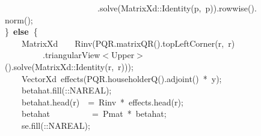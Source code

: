 \documentclass[shortnames,article]{jss}
\newcommand{\hlstd}[1]{\textcolor[rgb]{0,0,0}{#1}}
\newcommand{\hlopt}[1]{\textcolor[rgb]{0,0,0}{#1}}
\newcommand{\hlkwa}[1]{\textcolor[rgb]{0.61,0.13,0.93}{\bf{#1}}}
\newcommand{\hlkwd}[1]{\textcolor[rgb]{0,0,0}{#1}}
\begin{document}
\begin{figure}[htb]
    \hlstd{}\hlstd{\ \ \ \ \ \ \ \ \ \ \ \ \ \ \ \ \ \ \ \ \ \ }\hlstd{}\hlopt{.}\hlstd{}\hlkwd{solve}\hlstd{}\hlopt{(}\hlstd{MatrixXd}\hlopt{::}\hlstd{}\hlkwd{Identity}\hlstd{}\hlopt{(}\hlstd{p}\hlopt{,\ }\hlstd{p}\hlopt{)).}\hlstd{}\hlkwd{rowwise}\hlstd{}\hlopt{().}\hlstd{}\hlkwd{norm}\hlstd{}\hlopt{();}\hspace*{\fill}\\
    \hlstd{}\hlopt{\}\ }\hlstd{}\hlkwa{else\ }\hlstd{}\hlopt{\{}\hspace*{\fill}\\
    \hlstd{}\hlstd{\ \ \ \ }\hlstd{MatrixXd}\hlstd{\ \ \ \ }\hlstd{}\hlkwd{Rinv}\hlstd{}\hlopt{(}\hlstd{PQR}\hlopt{.}\hlstd{}\hlkwd{matrixQR}\hlstd{}\hlopt{().}\hlstd{}\hlkwd{topLeftCorner}\hlstd{}\hlopt{(}\hlstd{r}\hlopt{,\ }\hlstd{r}\hlopt{)}\hspace*{\fill}\\
    \hlstd{}\hlstd{\ \ \ \ \ \ \ \ \ }\hlstd{}\hlopt{.}\hlstd{triangularView}\hlopt{$<$}\hlstd{Upper}\hlopt{$>$().}\hlstd{}\hlkwd{solve}\hlstd{}\hlopt{(}\hlstd{MatrixXd}\hlopt{::}\hlstd{}\hlkwd{Identity}\hlstd{}\hlopt{(}\hlstd{r}\hlopt{,\ }\hlstd{r}\hlopt{)));}\hspace*{\fill}\\
    \hlstd{}\hlstd{\ \ \ \ }\hlstd{VectorXd\ }\hlkwd{effects}\hlstd{}\hlopt{(}\hlstd{PQR}\hlopt{.}\hlstd{}\hlkwd{householderQ}\hlstd{}\hlopt{().}\hlstd{}\hlkwd{adjoint}\hlstd{}\hlopt{()\ {*}\ }\hlstd{y}\hlopt{);}\hspace*{\fill}\\
    \hlstd{}\hlstd{\ \ \ \ }\hlstd{betahat}\hlopt{.}\hlstd{}\hlkwd{fill}\hlstd{}\hlopt{(::}\hlstd{NA\textunderscore REAL}\hlopt{);}\hspace*{\fill}\\
    \hlstd{}\hlstd{\ \ \ \ }\hlstd{betahat}\hlopt{.}\hlstd{}\hlkwd{head}\hlstd{}\hlopt{(}\hlstd{r}\hlopt{)}\hlstd{\ \ }\hlopt{=\ }\hlstd{Rinv\ }\hlopt{{*}\ }\hlstd{effects}\hlopt{.}\hlstd{}\hlkwd{head}\hlstd{}\hlopt{(}\hlstd{r}\hlopt{);}\hspace*{\fill}\\
    \hlstd{}\hlstd{\ \ \ \ }\hlstd{betahat}\hlstd{\ \ \ \ \ \ \ \ \ \ }\hlstd{}\hlopt{=\ }\hlstd{Pmat\ }\hlopt{{*}\ }\hlstd{betahat}\hlopt{;}\hspace*{\fill}\\
    \hlstd{}\hlstd{\ \ \ \ }\hlstd{se}\hlopt{.}\hlstd{}\hlkwd{fill}\hlstd{}\hlopt{(::}\hlstd{NA\textunderscore REAL}\hlopt{);}\hspace*{\fill}\\

\end{figure}
\end{document}
